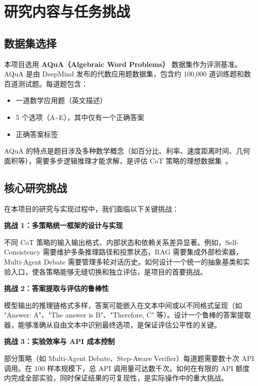 \documentclass[lang=cn,a4paper,newtx]{elegantpaper}
\begin{document}
\section{研究内容与任务挑战}

\subsection{数据集选择}

本项目选用 \textbf{AQuA（Algebraic Word Problems）} 数据集作为评测基准。AQuA 是由 DeepMind 发布的代数应用题数据集，包含约 100,000 道训练题和数百道测试题。每道题包含：

\begin{itemize}
  \item 一道数学应用题（英文描述）
  \item 5 个选项（A\textasciitilde E），其中仅有一个正确答案
  \item 正确答案标签
\end{itemize}

AQuA 的特点是题目涉及多种数学概念（如百分比、利率、速度距离时间、几何面积等），需要多步逻辑推理才能求解，是评估 CoT 策略的理想数据集~\cite{ling2017aqua}。

\subsection{核心研究挑战}

在本项目的研究与实现过程中，我们面临以下关键挑战：

\textbf{挑战 1：多策略统一框架的设计与实现}

不同 CoT 策略的输入输出格式、内部状态和依赖关系差异显著。例如，Self-Consistency 需要维护多条推理路径和投票状态，RAG 需要集成外部检索器，Multi-Agent Debate 需要管理多轮对话历史。如何设计一个统一的抽象基类和实验入口，使各策略能够无缝切换和独立评估，是项目的首要挑战。

\textbf{挑战 2：答案提取与评估的鲁棒性}

模型输出的推理链格式多样，答案可能嵌入在文本中间或以不同格式呈现（如 "Answer: A"、"The answer is B"、"Therefore, C" 等）。设计一个鲁棒的答案提取器，能够准确从自由文本中识别最终选项，是保证评估公平性的关键。

\textbf{挑战 3：实验效率与 API 成本控制}

部分策略（如 Multi-Agent Debate、Step-Aware Verifier）每道题需要数十次 API 调用。在 100 样本规模下，总 API 调用量可达数千次。如何在有限的 API 额度内完成全部实验，同时保证结果的可复现性，是实际操作中的重大挑战。
\end{document}
